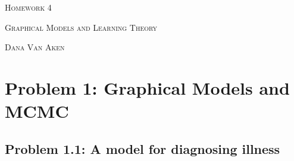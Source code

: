 \documentclass{article}
\begin{document}
\section*{}
\begin{center}
  \centerline{\textsc{\LARGE Homework 4}}
  \vspace{0.5em}
  \centerline{\textsc{Graphical Models and Learning Theory}}
  \vspace{1em}
  \textsc{\large Dana Van Aken} \\
\end{center}

\section*{Problem 1: Graphical Models and MCMC}

\subsection*{Problem 1.1: A model for diagnosing illness}
\end{document}
